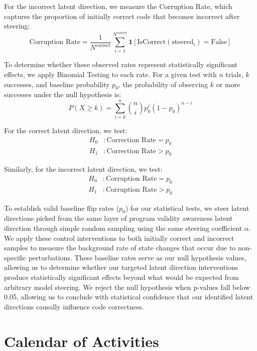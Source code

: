 For the incorrect latent direction, we measure the Corruption Rate, which captures the proportion of initially correct code that becomes incorrect after steering:
\begin{equation}
\text{Corruption Rate} = \frac{1}{N^{\text{correct}}} \sum_{i=1}^{N^{\text{correct}}} \mathbf{1}[\text{IsCorrect}(\text{steered}_i)= \text{False}]
\end{equation}

To determine whether these observed rates represent statistically significant effects, we apply Binomial Testing to each rate. For a given test with $n$ trials, $k$ successes, and baseline probability $p_0$, the probability of observing $k$ or more successes under the null hypothesis is:
\begin{equation}
P(X \geq k) = \sum_{i=k}^{n} \binom{n}{i} p_0^i (1-p_0)^{n-i}
\end{equation}

For the correct latent direction, we test:
\begin{align}
H_0&: \text{Correction Rate} = p_0 \\
H_1&: \text{Correction Rate} > p_0
\end{align}

Similarly, for the incorrect latent direction, we test:
\begin{align}
H_0&: \text{Corruption Rate} = p_0 \\
H_1&: \text{Corruption Rate} > p_0
\end{align}

To establish valid baseline flip rates ($p_0$) for our statistical tests, we steer latent directions picked from the same layer of program validity awareness latent direction through simple random sampling using the same steering coefficient $\alpha$. We apply these control interventions to both initially correct and incorrect samples to measure the background rate of state changes that occur due to non-specific perturbations. These baseline rates serve as our null hypothesis values, allowing us to determine whether our targeted latent direction interventions produce statistically significant effects beyond what would be expected from arbitrary model steering.  We reject the null hypothesis when p-values fall below 0.05, allowing us to conclude with statistical confidence that our identified latent directions causally influence code correctness.

\section{Calendar of Activities}

